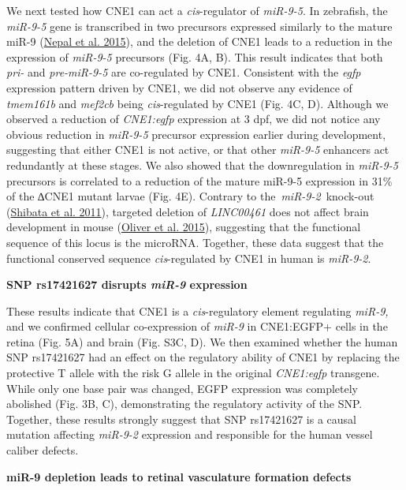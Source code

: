 \documentclass[]{article}
\begin{document}
We next tested how CNE1 can act a \emph{cis}-regulator of
\emph{miR-9-5}. In zebrafish, the \emph{miR-9-5} gene is transcribed in
two precursors expressed similarly to the mature miR-9
(\protect\hyperlink{_ENREF_21}{Nepal et al. 2015}), and the deletion of
CNE1 leads to a reduction in the expression of \emph{miR-9-5} precursors
(Fig. 4A, B). This result indicates that both \emph{pri-} and
\emph{pre-miR-9-5} are co-regulated by CNE1. Consistent with the
\emph{egfp} expression pattern driven by CNE1, we did not observe any
evidence of \emph{tmem161b} and \emph{mef2cb} being \emph{cis}-regulated
by CNE1 (Fig. 4C, D). Although we observed a reduction of
\emph{CNE1:egfp} expression at 3 dpf, we did not notice any obvious
reduction in \emph{miR-9-5} precursor expression earlier during
development, suggesting that either CNE1 is not active, or that other
\emph{miR-9-5} enhancers act redundantly at these stages. We also showed
that the downregulation in \emph{miR-9-5} precursors is correlated to a
reduction of the mature miR-9-5 expression in 31\% of the ∆CNE1 mutant
larvae (Fig. 4E). Contrary to the~\emph{miR-9-2}~knock-out
(\protect\hyperlink{_ENREF_28}{Shibata et al. 2011}), targeted deletion
of \emph{LINC00461} does not affect brain development in mouse
(\protect\hyperlink{_ENREF_23}{Oliver et al. 2015}), suggesting that the
functional sequence of this locus is the microRNA. Together, these data
suggest that the functional conserved sequence \emph{cis}-regulated by
CNE1 in human is \emph{miR-9-2}.

\textbf{SNP rs17421627 disrupts \emph{miR-9} expression }

These results indicate that CNE1 is a \emph{cis}-regulatory element
regulating \emph{miR-9,} and we confirmed cellular co-expression of
\emph{miR-9} in CNE1:EGFP+ cells in the retina (Fig. 5A) and brain (Fig.
S3C, D). We then examined whether the human SNP rs17421627 had an effect
on the regulatory ability of CNE1 by replacing the protective T allele
with the risk G allele in the original \emph{CNE1:egfp} transgene. While
only one base pair was changed, EGFP expression was completely abolished
(Fig. 3B, C), demonstrating the regulatory activity of the SNP.
Together, these results strongly suggest that SNP rs17421627 is a causal
mutation affecting \emph{miR-9-2} expression and responsible for the
human vessel caliber defects.

\textbf{miR-9 depletion leads to retinal vasculature formation defects}
\end{document}
